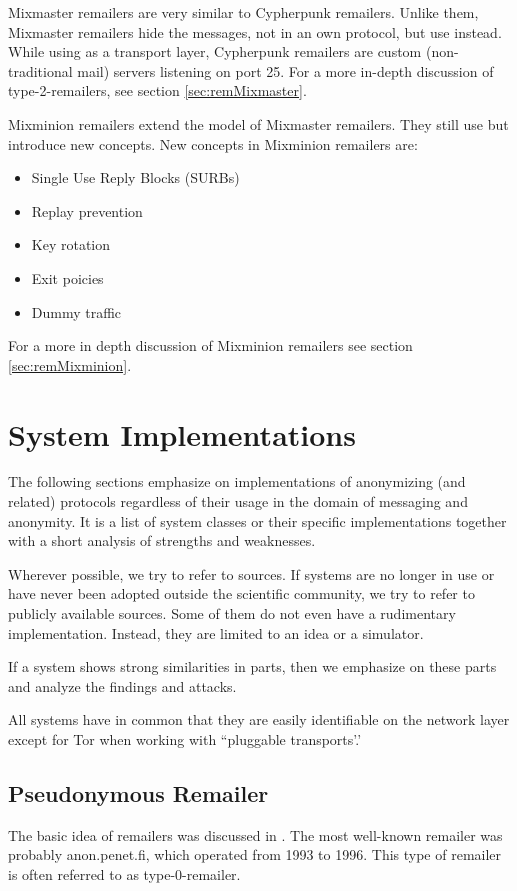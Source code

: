 Mixmaster remailers are very similar to Cypherpunk remailers. Unlike them, Mixmaster remailers hide the messages, not in an own protocol, but use  instead. While using  as a transport layer, Cypherpunk remailers are custom (non-traditional mail) servers listening on port 25. For a more in-depth discussion of type-2-remailers, see section \ref{sec:remMixmaster}.

Mixminion remailers extend the model of Mixmaster remailers. They still use  but introduce new concepts. New concepts in Mixminion remailers are:
\begin{itemize}
	\item Single Use Reply Blocks (SURBs)
	\item Replay prevention
	\item Key rotation
	\item Exit poicies
	\item Dummy traffic
\end{itemize}
For a more in depth discussion of Mixminion remailers see section \ref{sec:remMixminion}.

\section{System Implementations\label{sec:sysImpl}}
The following sections emphasize on implementations of anonymizing (and related) protocols regardless of their usage in the domain of messaging and anonymity. It is a list of system classes or their specific implementations together with a short analysis of strengths and weaknesses. 

Wherever possible, we try to refer to sources. If systems are no longer in use or have never been adopted outside the scientific community, we try to refer to publicly available sources. Some of them do not even have a rudimentary implementation. Instead, they are limited to an idea or a simulator.

If a system shows strong similarities in parts, then we emphasize on these parts and analyze the findings and attacks.

All systems have in common that they are easily identifiable on the network layer except for Tor when working with ``pluggable transports'.'

\subsection{Pseudonymous Remailer\label{sec:remPseudo}}
The basic idea of remailers was discussed in \cite{CHAUM1}. The most well-known remailer was probably anon.penet.fi, which operated from 1993 to 1996. This type of remailer is often referred to as type-0-remailer.

